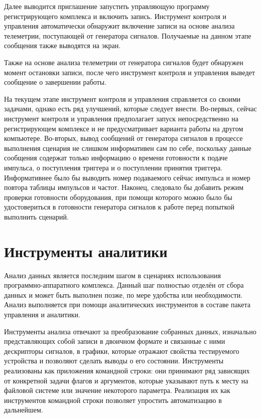\documentclass{report}
\begin{document}
Далее выводится приглашение запустить управляющую программу регистрирующего комплекса и включить запись. Инструмент контроля и управления автоматически обнаружит включение записи на основе анализа телеметрии, поступающей от генератора сигналов. Получаемые на данном этапе сообщения также выводятся на экран.

Также на основе анализа телеметрии от генератора сигналов будет обнаружен момент остановки записи, после чего инструмент контроля и управления выведет сообщение о завершении работы.

На текущем этапе инструмент контроля и управления справляется со своими задачами, однако есть ряд улучшений, которые следует внести. Во-первых, сейчас инструмент контроля и управления предполагает запуск непосредственно на регистрирующем комплексе и не предусматривает варианта работы на другом компьютере. Во-вторых, вывод сообщений от генератора сигналов в процессе выполнения сценария не слишком информативен сам по себе, поскольку данные сообщения содержат только информацию о времени готовности к подаче импульса, о поступления триггера и о поступлении принятия триггера. Информативнее было бы выводить номер подаваемого сейчас импульса и номер повтора таблицы импульсов и частот. Наконец, следовало бы добавить режим проверки готовности оборудования, при помощи которого можно было бы удостовериться в готовности генератора сигналов к работе перед попыткой выполнить сценарий.

\section{Инструменты аналитики}

Анализ данных является последним шагом в сценариях использования программно-аппаратного комплекса. Данный шаг полностью отделён от сбора данных и может быть выполнен позже, по мере удобства или необходимости. Анализ выполняется при помощи аналитических инструментов в составе пакета управления и аналитики.

Инструменты анализа отвечают за преобразование собранных данных, изначально представляющих собой записи в двоичном формате и связанные с ними дескрипторы сигналов, в графики, которые отражают свойства тестируемого устройства и позволяют сделать выводы о его состоянии. Инструменты реализованы как приложения командной строки: они принимают ряд зависящих от конкретной задачи флагов и аргументов, которые указывают путь к месту на файловой системе или значение некоторого параметра. Реализация их как инструментов командной строки позволяет упростить автоматизацию в дальнейшем.
\end{document}
